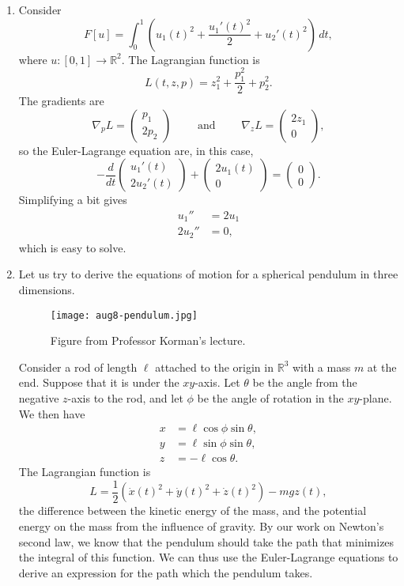 \documentclass[11pt]{book}
\newcommand{\R}{\mathbb{R}}
\begin{document}
\begin{enumerate}
\item
Consider
\[
F[u] = \int_0^1 \left( u_1(t)^2 + \frac{u_1'(t)^2}{2} + u_2'(t)^2 \right) \, dt,
\]
where $u : [0, 1] \to \R^2$. The Lagrangian function is
\[
L(t,z,p) = z_1^2 + \frac{p_1^2}{2} + p_2^2.
\]
The gradients are
\[
\nabla_p L = \begin{pmatrix}
p_1 \\ 2p_2
\end{pmatrix} \qquad \text{ and } \qquad \nabla_z L = \begin{pmatrix}
2z_1 \\ 0
\end{pmatrix},
\]
so the Euler-Lagrange equation are, in this case,
\[
-\frac{d}{dt} \begin{pmatrix}
u_1'(t) \\
2u_2'(t)
\end{pmatrix} + \begin{pmatrix}
2u_1(t) \\ 0
\end{pmatrix} = \begin{pmatrix}
0 \\ 0
\end{pmatrix}.
\]
Simplifying a bit gives
\begin{align*}
u_1'' &= 2u_1 \\
2u_2'' &= 0,
\end{align*}
which is easy to solve.

\item
Let us try to derive the equations of motion for a spherical pendulum in three dimensions.

\begin{figure}[H]
\texttt{[image: aug8-pendulum.jpg]}
\centering
\caption{Figure from Professor Korman's lecture.}
\end{figure}

Consider a rod of length $\ell$ attached to the origin in $\R^3$ with a mass $m$ at the end. Suppose that it is under the $xy$-axis. Let $\theta$ be the angle from the negative $z$-axis to the rod, and let $\phi$ be the angle of rotation in the $xy$-plane. We then have
\begin{align*}
x &= \ell \cos \phi \sin \theta, \\
y  &= \ell \sin \phi \sin \theta, \\
z &= -\ell \cos \theta.
\end{align*}
The Lagrangian function is
\[
L = \frac{1}{2} \left( \dot{x}(t)^2 + \dot{y}(t)^2 + \dot{z}(t)^2 \right) - mgz(t),
\]
the difference between the kinetic energy of the mass, and the potential energy on the mass from the influence of gravity. By our work on Newton's second law, we know that the pendulum should take the path that minimizes the integral of this function. We can thus use the Euler-Lagrange equations to derive an expression for the path which the pendulum takes.


\end{enumerate}
\end{document}
